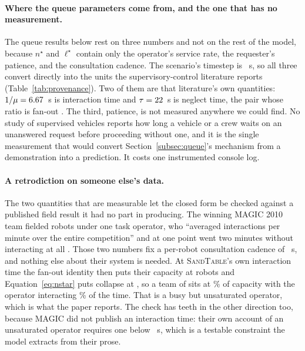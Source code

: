 \documentclass[11pt]{article}
\newcommand{\sandtable}{\textsc{SandTable}}
\begin{document}
\paragraph{Where the queue parameters come from, and the one that has no measurement.} The queue
results below rest on three numbers and not on the rest of the model, because $n^{\star}$ and
$\ell^{\star}$ contain only the operator's service rate, the requester's patience, and the
consultation cadence. The scenario's timestep is \provStep{}~s, so all three convert directly into
the units the supervisory-control literature reports (Table~\ref{tab:provenance}). Two of them are
that literature's own quantities: $1/\mu = 6.67{}$~s is interaction time and $\tau =
22{}$~s is neglect time, the pair whose ratio is fan-out \citep{olsen2004fanout}. The third,
patience, is not measured anywhere we could find. No study of supervised vehicles reports how long
a vehicle or a crew waits on an unanswered request before proceeding without one, and it is the
single measurement that would convert Section~\ref{subsec:queue}'s mechanism from a demonstration
into a prediction. It costs one instrumented console log.

\begin{table}[H]
\centering
\caption{Provenance of the queue parameters, in the units the supervisory-control literature uses. The scenario timestep is \provStep{}~s. One row is empty, and that is the finding.}
\label{tab:provenance}

\end{table}

\paragraph{A retrodiction on someone else's data.} The two quantities that are measurable let the
closed form be checked against a published field result it had no part in producing. The winning
MAGIC 2010 team fielded \provMagicN{} robots under one task operator, who ``averaged
\provMagicRate{} interactions per minute over the entire competition'' and at one point went two
minutes without interacting at all \citep{olson2012magic}. Those two numbers fix a per-robot
consultation cadence of \provMagicNT{}~s, and nothing else about their system is needed. At
\sandtable{}'s own interaction time the fan-out identity then puts their capacity at
\provMagicFanout{} robots and Equation~\ref{eq:nstar} puts collapse at \provMagicNstar{}, so a team
of \provMagicN{} sits at \provMagicHeadroom{}\% of capacity with the operator interacting
\provMagicUtil{}\% of the time. That is a busy but unsaturated operator, which is what the paper
reports. The check has teeth in the other direction too, because MAGIC did not publish an
interaction time: their own account of an unsaturated operator requires one below
\provMagicITBound{}~s, which is a testable constraint the model extracts from their prose.
\end{document}
